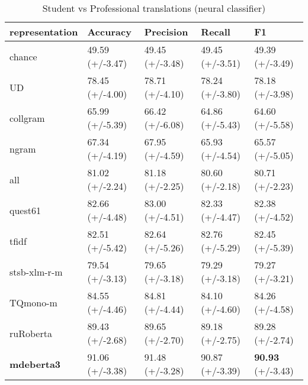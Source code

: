\begin{table}[H]
	\centering
	\begin{tabular}{l|llll}
		\toprule
		representation & Accuracy        & Precision       & Recall          & F1              \\
		\midrule
		chance          & 49.59 (+/-3.47) & 49.45 (+/-3.48) & 49.45 (+/-3.51) & 49.39 (+/-3.49) \\
		\midrule
		UD              & 78.45 (+/-4.00) & 78.71 (+/-4.10) & 78.24 (+/-3.80) & 78.18 (+/-3.98) \\
		collgram        & 65.99 (+/-5.39) & 66.42 (+/-6.08) & 64.86 (+/-5.43) & 64.60 (+/-5.58) \\
		ngram           & 67.34 (+/-4.19) & 67.95 (+/-4.59) & 65.93 (+/-4.54) & 65.57 (+/-5.05) \\
		all             & 81.02 (+/-2.24) & 81.18 (+/-2.25) & 80.60 (+/-2.18) & 80.71 (+/-2.23) \\
		\midrule
		quest61         & 82.66 (+/-4.48) & 83.00 (+/-4.51) & 82.33 (+/-4.47) & 82.38 (+/-4.52) \\
		\midrule
		tfidf           & 82.51 (+/-5.42) & 82.64 (+/-5.26) & 82.76 (+/-5.29) & 82.45 (+/-5.39) \\
		\midrule
		stsb-xlm-r-m          & 79.54 (+/-3.13) & 79.65 (+/-3.18) & 79.29 (+/-3.18) & 79.27 (+/-3.21) \\
		TQmono-m        & 84.55 (+/-4.46) & 84.81 (+/-4.44) & 84.10 (+/-4.60) & 84.26 (+/-4.58) \\
		ruRoberta & 89.43 (+/-2.68) & 89.65 (+/-2.70) & 89.18 (+/-2.75) & 89.28 (+/-2.74) \\
		\textbf{mdeberta3}  & 91.06 (+/-3.38) & 91.48 (+/-3.28) & 90.87 (+/-3.39) & \boxit{0.4in} \textbf{90.93} (+/-3.43) \\
	\bottomrule
	\end{tabular}
\caption{\label{tab:stu-pro_neu}Student vs Professional translations (neural classifier)}
\end{table}


